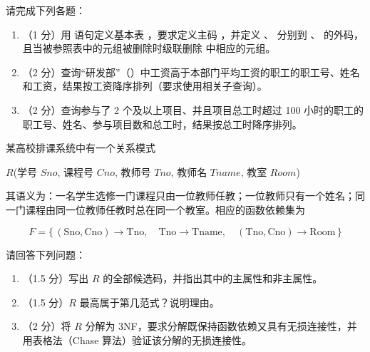 \documentclass[a4paper,11pt]{article}
\begin{document}
请完成下列各题：
\begin{enumerate}[label=（\arabic*）, leftmargin=2.4em, itemsep=1pt]
  \item（1 分）用  语句定义基本表 ，要求定义主码 ，并定义 、 分别到 、 的外码，且当被参照表中的元组被删除时级联删除  中相应的元组。
  \item（2 分）查询“研发部”（）中工资高于本部门平均工资的职工的职工号、姓名和工资，结果按工资降序排列（要求使用相关子查询）。
  \item（2 分）查询参与了 2 个及以上项目、并且项目总工时超过 100 小时的职工的职工号、姓名、参与项目数和总工时，结果按总工时降序排列。
\end{enumerate}
\anslines{5.2cm}

\q 某高校排课系统中有一个关系模式

\begin{center}
$R$(学号 $Sno$, 课程号 $Cno$, 教师号 $Tno$, 教师名 $Tname$, 教室 $Room$)
\end{center}

\noindent 其语义为：一名学生选修一门课程只由一位教师任教；一位教师只有一个姓名；同一门课程由同一位教师任教时总在同一个教室。相应的函数依赖集为

\[
F=\{\,(\text{Sno},\text{Cno})\to\text{Tno},\quad
\text{Tno}\to\text{Tname},\quad
(\text{Tno},\text{Cno})\to\text{Room}\,\}
\]

请回答下列问题：
\begin{enumerate}[label=（\arabic*）, leftmargin=2.4em, itemsep=1pt]
  \item（1.5 分）写出 $R$ 的全部候选码，并指出其中的主属性和非主属性。
  \item（1.5 分）$R$ 最高属于第几范式？说明理由。
  \item（2 分）将 $R$ 分解为 3NF，要求分解既保持函数依赖又具有无损连接性，并用表格法（Chase 算法）验证该分解的无损连接性。
\end{enumerate}
\anslines{5.6cm}
\end{document}
